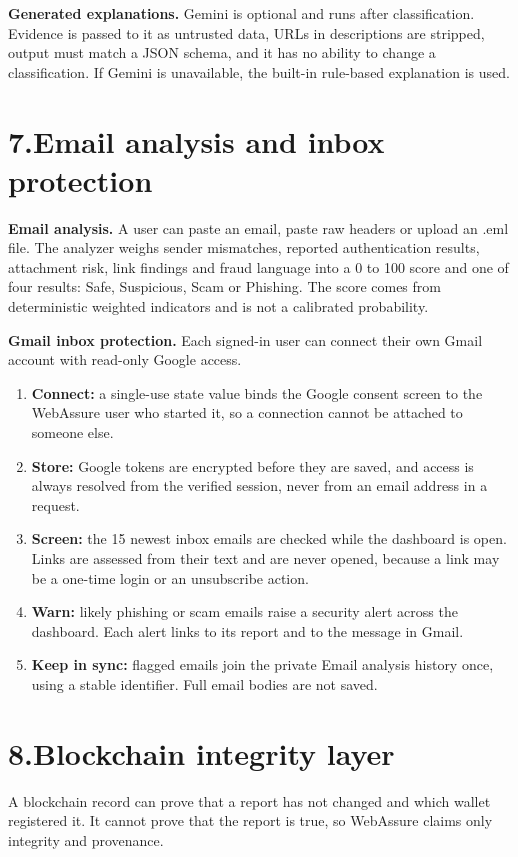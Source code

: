 \documentclass[11pt,a4paper]{article}
\begin{document}
\textbf{Generated explanations.} Gemini is optional and runs after classification. Evidence is passed to it as untrusted data, URLs in descriptions are stripped, output must match a JSON schema, and it has no ability to change a classification. If Gemini is unavailable, the built-in rule-based explanation is used.

\section{7.\quad Email analysis and inbox protection}
\textbf{Email analysis.} A user can paste an email, paste raw headers or upload an .eml file. The analyzer weighs sender mismatches, reported authentication results, attachment risk, link findings and fraud language into a 0 to 100 score and one of four results: Safe, Suspicious, Scam or Phishing. The score comes from deterministic weighted indicators and is not a calibrated probability.

\textbf{Gmail inbox protection.} Each signed-in user can connect their own Gmail account with read-only Google access.

\begin{enumerate}
\item \textbf{Connect:} a single-use state value binds the Google consent screen to the WebAssure user who started it, so a connection cannot be attached to someone else.
\item \textbf{Store:} Google tokens are encrypted before they are saved, and access is always resolved from the verified session, never from an email address in a request.
\item \textbf{Screen:} the 15 newest inbox emails are checked while the dashboard is open. Links are assessed from their text and are never opened, because a link may be a one-time login or an unsubscribe action.
\item \textbf{Warn:} likely phishing or scam emails raise a security alert across the dashboard. Each alert links to its report and to the message in Gmail.
\item \textbf{Keep in sync:} flagged emails join the private Email analysis history once, using a stable identifier. Full email bodies are not saved.
\end{enumerate}
\section{8.\quad Blockchain integrity layer}
A blockchain record can prove that a report has not changed and which wallet registered it. It cannot prove that the report is true, so WebAssure claims only integrity and provenance.
\end{document}
